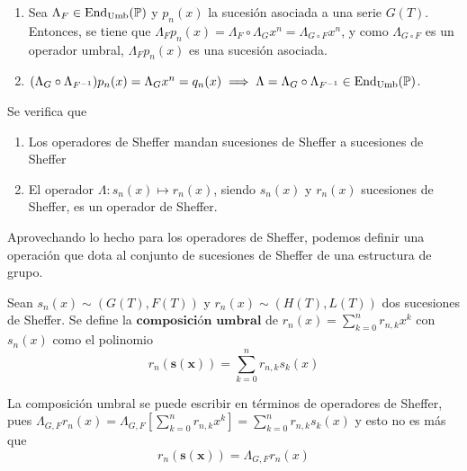 \begin{demo}
    \begin{enumerate}
        \item Sea $\Lambda_F \in \operatorname*{End}_{\mathrm{Umb}}(\mathbb{P})$ y $p_n(x)$ la sucesión asociada a una serie $G(T)$. Entonces, se tiene que $\Lambda_F p_n(x) = \Lambda_F \circ \Lambda_G x^n = \Lambda_{G \circ F}x^n$, y como $\Lambda_{G \circ F}$ es un operador umbral, $\Lambda_F p_n(x)$ es una sucesión asociada.
        \item $(\Lambda_G \circ \Lambda_{F^{-1}})p_n(x) = \Lambda_G x^n = q_n(x) \implies \Lambda = \Lambda_G \circ \Lambda_{F^{-1}} \in \operatorname*{End}_{\mathrm{Umb}}(\mathbb{P})$. \qedhere 
    \end{enumerate}
\end{demo}

\begin{corolario} Se verifica que
    \begin{enumerate}
        \item Los operadores de Sheffer mandan sucesiones de Sheffer a sucesiones de Sheffer
        \item El operador $\Lambda: s_n(x) \mapsto r_n(x)$, siendo $s_n(x)$ y $r_n(x)$ sucesiones de Sheffer, es un operador de Sheffer.
    \end{enumerate}
\end{corolario}

Aprovechando lo hecho para los operadores de Sheffer, podemos definir una operación que dota al conjunto de sucesiones de Sheffer de una estructura de grupo.

\begin{definicion}
    Sean $s_n(x) \sim (G(T), F(T))$ y $r_n(x) \sim (H(T), L(T))$ dos sucesiones de Sheffer. Se define la $\textbf{composición umbral}$ de $r_n(x) = \displaystyle \sum_{k=0}^n r_{n,k}x^k$ con $s_n(x)$ como el polinomio
    \begin{equation*}
        r_n(\mathbf{s(x)}) = \sum_{k=0}^n r_{n,k}s_k(x)
    \end{equation*} 
\end{definicion}

\begin{obs}
    La composición umbral se puede escribir en términos de operadores de Sheffer, pues $\Lambda_{G,F}r_n(x) = \Lambda_{G,F}[\sum_{k=0}^n r_{n,k}x^k] = \sum_{k=0}^n r_{n,k}s_k(x)$ y esto no es más que
    \begin{equation}\label{composicion umbral con operador}
        r_n(\mathbf{s(x)}) = \Lambda_{G,F}r_n(x)
    \end{equation}
\end{obs}

